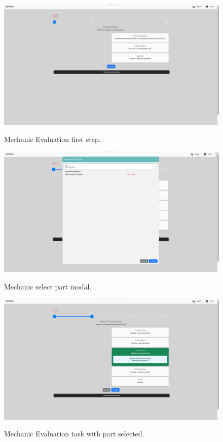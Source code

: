\begin{figure}[h]
  \caption{Mechanic Evaluation first step.}
  \centering
  \includegraphics[width=\textwidth]{figs/Implementation/mechanic/MechanicEvaluationNormal}
  \label{fig:figure2}
\end{figure}



\begin{figure}[h]
  \caption{Mechanic select part modal.}
  \centering
  \includegraphics[width=\textwidth]{figs/Implementation/mechanic/MechanicEvaluationSelectTaskWitPart}
  \label{fig:figure2}
\end{figure}

\begin{figure}[h]
  \caption{Mechanic Evaluation task with part selected.}
  \centering
  \includegraphics[width=\textwidth]{figs/Implementation/mechanic/TaskSelected}
  \label{fig:figure2}
\end{figure}

